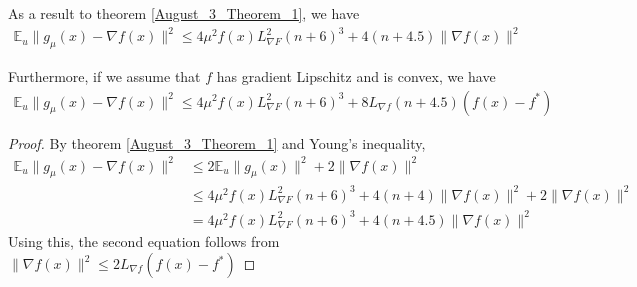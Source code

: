 \documentclass{article}
\begin{document}
\begin{corollary} \label{August_3_Corollary_1}
As a result to theorem \ref{August_3_Theorem_1}, we have
\begin{align}
\mathbb{E}_u\|g_{\mu}(x)-\nabla f(x)\|^2 \leq 4\mu^2f(x)L_{\nabla F}^2(n+6)^3 + 4(n+4.5)\|\nabla f(x)\|^2
\end{align}

Furthermore, if we assume that $f$ has gradient Lipschitz and is convex, we have 
\begin{align}
\mathbb{E}_u\|g_{\mu}(x)-\nabla f(x)\|^2 \leq 4\mu^2f(x)L_{\nabla F}^2(n+6)^3 + 8L_{\nabla f}(n+4.5)(f(x) - f^*)
\end{align}

\begin{proof}
By theorem \ref{August_3_Theorem_1} and Young's inequality,
\begin{align*}
\mathbb{E}_u\|g_{\mu}(x) - \nabla f(x)\|^2 & \leq 2\mathbb{E}_u\|g_{\mu}(x)\|^2 + 2\|\nabla f(x)\|^2 \\ & \leq 4\mu^2f(x)L_{\nabla F}^2(n+6)^3 + 4(n+4)\|\nabla f(x)\|^2 + 2\|\nabla f(x)\|^2 \\ & = 4\mu^2f(x)L_{\nabla F}^2(n+6)^3 + 4(n+4.5)\|\nabla f(x)\|^2
\end{align*}
Using this, the second equation follows from $\|\nabla f(x)\|^2 \leq 2L_{\nabla f}(f(x)-f^*)$
\end{proof}
\end{corollary}
\end{document}
